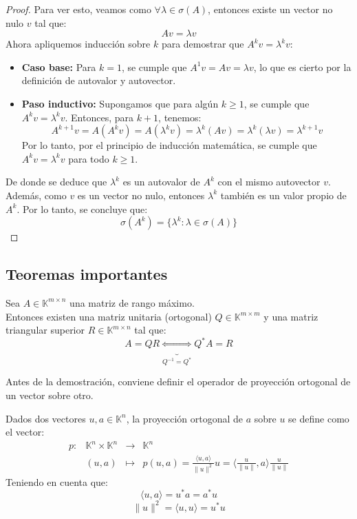 \begin{proof}
    Para ver esto, veamos como $ \forall \lambda \in \sigma(A) $, entonces existe un vector no nulo $ v $ tal que:
    \[
        Av = \lambda v
    \]
    Ahora apliquemos inducción sobre $ k $ para demostrar que $ A^k v = \lambda^k v $:
    \begin{itemize}
        \item \textbf{Caso base:} Para $ k = 1 $, se cumple que $ A^1 v = Av = \lambda v $, lo que es cierto por la definición de autovalor y autovector.
        \item \textbf{Paso inductivo:} Supongamos que para algún $ k \geq 1 $, se cumple que $ A^k v = \lambda^k v $. Entonces, para $ k + 1 $, tenemos:
        \[
            A^{k+1} v =
            A(A^k v) =
            A(\lambda^k v) =
            \lambda^k (Av) =
            \lambda^k (\lambda v) =
            \lambda^{k+1} v
        \]
        Por lo tanto, por el principio de inducción matemática, se cumple que $ A^k v = \lambda^k v $ para todo $ k \geq 1 $.
    \end{itemize}
    De donde se deduce que $ \lambda^k $ es un autovalor de $ A^k $ con el mismo autovector $ v $. Además, como $ v $ es un vector no nulo, entonces $ \lambda^k $ también es un valor propio de $ A^k $. Por lo tanto, se concluye que:
    \[
        \sigma(A^k) = \{ \lambda^k : \lambda \in \sigma(A) \}
    \]
\end{proof}

\subsection{Teoremas importantes}

\begin{teorema}[Descomposición QR]
    Sea $A \in \mathbb{K}^{m \times n}$ una matriz de rango máximo.\\
    Entonces existen una matriz unitaria (ortogonal) $Q \in \mathbb{K}^{m \times m}$ y una matriz triangular superior $R \in \mathbb{K}^{m \times n}$ tal que:
    \[
        A = QR \underbrace{\iff}_{Q^{-1} = Q^*}
        Q^* A = R
    \]
\end{teorema}

Antes de la demostración, conviene definir el operador de proyección ortogonal de un vector sobre otro.

\begin{definición}
    Dados dos vectores $ u, a \in \mathbb{K}^n $, la proyección ortogonal de $ a $ sobre $ u $ se define como el vector:
    \[
        \begin{array}{rccl}
            p : & \mathbb{K}^n \times \mathbb{K}^n & \to & \mathbb{K}^n \\
            & (u, a) & \mapsto & p(u, a) = 
            \frac{\langle u, a \rangle}{\|u\|^2} u =
            \langle \frac{u}{\|u\|}, a \rangle \frac{u}{\|u\|}
        \end{array}
    \]
    Teniendo en cuenta que:
    \[
        \langle u, a \rangle = u^* a = a^* u
    \]
    \[
        \|u\|^2 = \langle u, u \rangle = u^* u
    \]
\end{definición}

